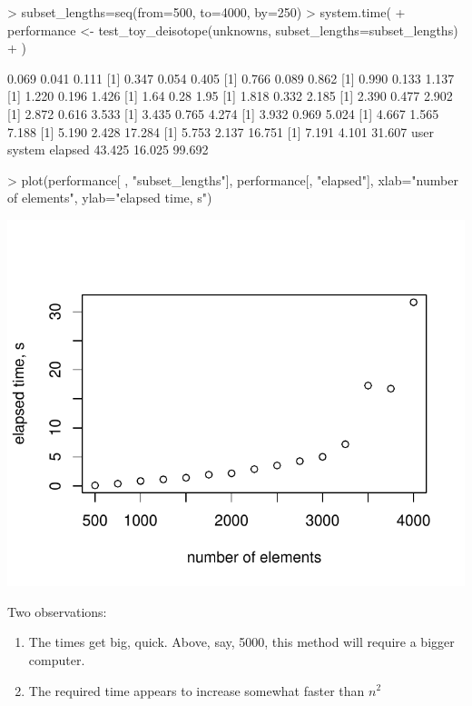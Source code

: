 \documentclass{article}
\begin{document}
\begin{Schunk}
\begin{Sinput}
> subset_lengths=seq(from=500, to=4000, by=250)
> system.time({
+   performance <- test_toy_deisotope(unknowns, subset_lengths=subset_lengths)
+ })
\end{Sinput}
\begin{Soutput}
[1] 0.069 0.041 0.111
[1] 0.347 0.054 0.405
[1] 0.766 0.089 0.862
[1] 0.990 0.133 1.137
[1] 1.220 0.196 1.426
[1] 1.64 0.28 1.95
[1] 1.818 0.332 2.185
[1] 2.390 0.477 2.902
[1] 2.872 0.616 3.533
[1] 3.435 0.765 4.274
[1] 3.932 0.969 5.024
[1] 4.667 1.565 7.188
[1]  5.190  2.428 17.284
[1]  5.753  2.137 16.751
[1]  7.191  4.101 31.607
   user  system elapsed 
 43.425  16.025  99.692 
\end{Soutput}
\end{Schunk}

\begin{Schunk}
\begin{Sinput}
> plot(performance[ , "subset_lengths"], performance[, "elapsed"], xlab="number of elements", ylab="elapsed time, s")
\end{Sinput}
\end{Schunk}
\includegraphics{initial_directions-performanceFig}

Two observations:
\begin{enumerate}
  \item The times get big, quick. Above, say, 5000, this method will require a bigger computer.
  \item The required time appears to increase somewhat faster than $n^2$
\end{enumerate}
\end{document}
